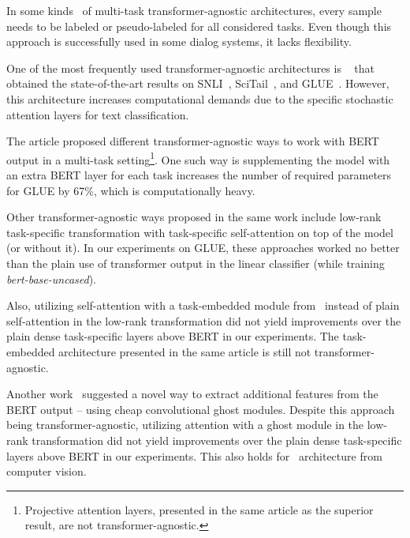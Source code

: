 In some kinds~\cite{pseudolabeling} of multi-task transformer-agnostic architectures, every sample needs to be labeled or pseudo-labeled for all considered tasks. Even though this approach is successfully used in some dialog systems\cite{dream1_trudy}, it lacks flexibility.

One of the most frequently used transformer-agnostic architectures is ~\cite{MTDNN:19} that obtained the state-of-the-art results on SNLI~\cite{snli}, SciTail~\cite{khot2018scitail}, and GLUE~\cite{GLUE:19}. However, this architecture increases computational demands due to the specific stochastic attention layers for text classification.

The article \cite{PAL:19} proposed different transformer-agnostic ways to work with BERT output in a multi-task setting\footnote{Projective attention layers, presented in the same article as the superior result, are not transformer-agnostic.}. One such way is supplementing the model with an extra BERT layer for each task increases the number of required parameters for GLUE by 67\%, which is computationally heavy. 

Other transformer-agnostic ways proposed in the same work include low-rank task-specific transformation with task-specific self-attention on top of the model (or without it). In our experiments on GLUE, these approaches worked no better than the plain use of transformer output in the linear classifier (while training \textit{bert-base-uncased}).

 Also, utilizing self-attention with a task-embedded module from~\cite{TaskEmbedded2021} instead of plain self-attention in the low-rank transformation did not yield improvements over the plain dense task-specific layers above BERT in our experiments. The task-embedded architecture presented in the same article is still not transformer-agnostic.

Another work~\cite{GhostBert2021} suggested a novel way to extract additional features from the BERT output -- using cheap convolutional ghost modules. Despite this approach being transformer-agnostic, utilizing attention with a ghost module in the low-rank transformation did not yield improvements over the plain dense task-specific layers above BERT in our experiments. This also holds for~\cite{el-nouby2021xcit} architecture from computer vision.


